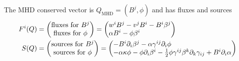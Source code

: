 \documentclass[a4paper]{article}
\newcommand{\desc}[1]{\text{#1}\quad}
\newcommand{\mhd}{\text{MHD}}
\newenvironment{pvector}{\begin{pmatrix*}[l]}{\end{pmatrix*}}
\begin{document}
The MHD conserved vector is $Q_\mhd = (B^j, \phi)$ and has
fluxes and sources
\begin{align}
F^i(Q) &= \begin{pmatrix}
\text{fluxes for }B^j \\
\text{fluxes for }\phi
\end{pmatrix}
=
\begin{pvector}
w^i B^j - v^j B^i - B^i \beta^j \\
\alpha B^i - \phi \beta^i
\end{pvector}
\\
S(Q) &=
\begin{pmatrix}
\text{sources for } B^j \\
\text{sources for } \phi
\end{pmatrix}
=
\begin{pvector}
-B^i \partial_i \beta^j - \alpha \gamma^{ij} \partial_i \phi \\
- \alpha \kappa \phi - \phi \partial_i \beta^i
- \frac 12 \phi \gamma^{ij} \beta^k \partial_k \gamma_{ij}
+ B^i \partial_i \alpha
\end{pvector}
\end{align}
\end{document}
